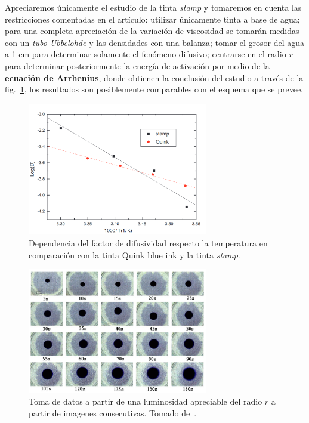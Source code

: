 \documentclass[11pt]{article}
\begin{document}
Apreciaremos únicamente el estudio de la tinta \textit{stamp} y tomaremos en cuenta las restricciones comentadas en el artículo: utilizar únicamente tinta a base de agua; para una completa apreciación de la variación de viscosidad se tomarán medidas con un \textit{tubo Ubbelohde} y las densidades con una balanza; tomar el grosor del agua a 1 cm para determinar solamente el fenómeno difusivo; centrarse en el radio $r$ para determinar posteriormente la energía de activación por medio de la \textbf{ecuación de Arrhenius}, donde obtienen la conclusión del estudio a través de la fig.~\ref{fig:arrLee_plot_energia}, los resultados son posiblemente comparables con el esquema que se prevee.
\begin{figure}[htp]
    \centering
    \includegraphics[width=0.7\textwidth]{figs/arrLee_energia_activacion.png}
    \caption{Dependencia del factor de difusividad respecto la temperatura en comparación con la tinta Quink blue ink y la tinta \textit{stamp}.}
    \label{fig:arrLee_plot_energia}
\end{figure}
\begin{figure}[htp]
    \centering
    \includegraphics[width=0.7\textwidth]{figs/arrLee_fotos.png}
    \caption{Toma de datos a partir de una luminosidad apreciable del radio $r$ a partir de imagenes consecutivas. Tomado de~\cite{leeInkDifussionWater2004}.}
    \label{fig:arrLee_fotos}
\end{figure}
\end{document}
